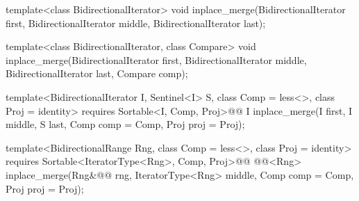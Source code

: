 %
\begin{removedblock}
\begin{itemdecl}
template<class BidirectionalIterator>
  void inplace_merge(BidirectionalIterator first,
                     BidirectionalIterator middle,
                     BidirectionalIterator last);

template<class BidirectionalIterator, class Compare>
  void inplace_merge(BidirectionalIterator first,
                     BidirectionalIterator middle,
                     BidirectionalIterator last, Compare comp);
\end{itemdecl}
\end{removedblock}
\begin{addedblock}
\begin{itemdecl}
template<BidirectionalIterator I, Sentinel<I> S, class Comp = less<>,
    class Proj = identity>
  requires Sortable<I, Comp, Proj>@\newtxt{()}@
  I
    inplace_merge(I first, I middle, S last, Comp comp = Comp{}, Proj proj = Proj{});

template<BidirectionalRange Rng, class Comp = less<>, class Proj = identity>
  requires Sortable<IteratorType<Rng>, Comp, Proj>@\newtxt{()}@
  @@<Rng>
    inplace_merge(Rng&@\newtxt{\&}@ rng, IteratorType<Rng> middle, Comp comp = Comp{},
                  Proj proj = Proj{});
\end{itemdecl}
\end{addedblock}

